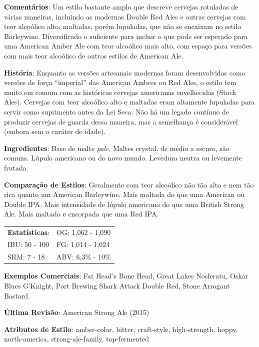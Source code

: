 \textbf{Comentários}: Um estilo bastante amplo que descreve cervejas rotuladas de várias maneiras, incluindo as modernas Double Red Ales e outras cervejas com teor alcoólico alto, maltadas, porém lupuladas, que não se encaixam no estilo Barleywine. Diversificado o suficiente para incluir o que pode ser esperado para uma American Amber Ale com teor alcoólico mais alto, com espaço para versões com mais teor alcoólico de outros estilos de American Ale.

\textbf{História}: Enquanto as versões artesanais modernas foram desenvolvidas como versões de força “imperial” das American Ambers ou Red Ales, o estilo tem muito em comum com as históricas cervejas americanas envelhecidas (Stock Ales). Cervejas com teor alcoólico alto e maltadas eram altamente lupuladas para servir como suprimento antes da Lei Seca. Não há um legado contínuo de produzir cervejas de guarda dessa maneira, mas a semelhança é considerável (embora sem o caráter de idade).

\textbf{Ingredientes}: Base de malte \textit{pale}. Maltes crystal, de médio a escuro, são comuns. Lúpulo americano ou do novo mundo. Levedura neutra ou levemente frutada.

\textbf{Comparação de Estilos}: Geralmente com teor alcoólico não tão alto e nem tão rica quanto um American Barleywine. Mais maltada do que uma American ou Double IPA. Mais intensidade de lúpulo americano do que uma British Strong Ale. Mais maltado e encorpada que uma Red IPA.

\begin{tabular}{@{}p{35mm}p{35mm}@{}}
  \textbf{Estatísticas}: & OG: 1,062 - 1,090  \\
  IBU: 50 - 100  & FG: 1,014 - 1,024   \\
  SRM: 7 - 18 & ABV: 6,3\% - 10\%
\end{tabular}

\textbf{Exemplos Comerciais}: Fat Head's Bone Head, Great Lakes Nosferatu, Oskar Blues G'Knight, Port Brewing Shark Attack Double Red, Stone Arrogant Bastard.

\textbf{Última Revisão}: American Strong Ale (2015)

\textbf{Atributos de Estilo}: amber-color, bitter, craft-style, high-strength, hoppy, north-america, strong-ale-family, top-fermented
